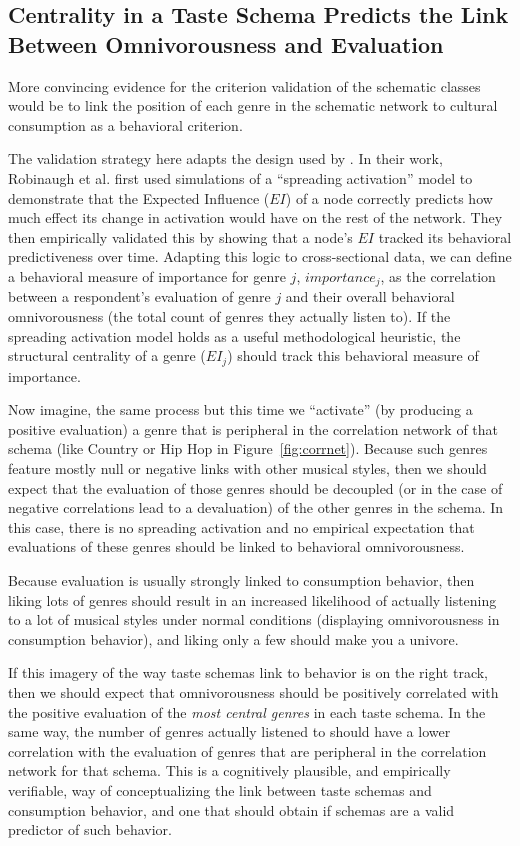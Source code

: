 \documentclass[preprint, authoryear,11pt, 3p]{elsarticle}
\begin{document}
\subsection{Centrality in a Taste Schema Predicts the Link Between Omnivorousness and Evaluation}
More convincing evidence for the criterion validation of the schematic classes would be to link the position of each genre in the schematic network to cultural consumption as a behavioral criterion. 

The validation strategy here adapts the design used by \citet{robinaugh2016identifying}. In their work, Robinaugh et al. first used simulations of a ``spreading activation'' model to demonstrate that the Expected Influence ($EI$) of a node correctly predicts how much effect its change in activation would have on the rest of the network. They then empirically validated this by showing that a node's $EI$ tracked its behavioral predictiveness over time. Adapting this logic to cross-sectional data, we can define a behavioral measure of importance for genre $j$, $importance_j$, as the correlation between a respondent's evaluation of genre $j$ and their overall behavioral omnivorousness (the total count of genres they actually listen to). If the spreading activation model holds as a useful methodological heuristic, the structural centrality of a genre ($EI_j$) should track this behavioral measure of importance. 

Now imagine, the same process but this time we ``activate'' (by producing a positive evaluation) a genre that is peripheral in the correlation network of that schema (like Country or Hip Hop in Figure~\ref{fig:corrnet}). Because such genres feature mostly null or negative links with other musical styles, then we should expect that the evaluation of those genres should be decoupled (or in the case of negative correlations lead to a devaluation) of the other genres in the schema. In this case, there is no spreading activation and no empirical expectation that evaluations of these genres should be linked to behavioral omnivorousness. 

Because evaluation is usually strongly linked to consumption behavior, then liking lots of genres should result in an increased likelihood of actually listening to a lot of musical styles under normal conditions (displaying omnivorousness  in consumption behavior), and liking only a few should make you a univore. 

If this imagery of the way taste schemas link to behavior is on the right track, then we should expect that omnivorousness should be positively correlated with the positive evaluation of the {\em most central genres} in each taste schema. In the same way, the number of genres actually listened to should have a lower correlation with the evaluation of genres that are peripheral in the correlation network for that schema. This is a cognitively plausible, and empirically verifiable, way of conceptualizing the link between taste schemas and consumption behavior, and one that should obtain if schemas are a valid predictor of such behavior. 
\end{document}
